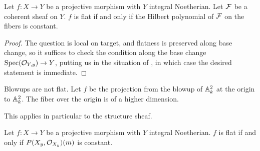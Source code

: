 \begin{proposition}\label{prop: constant hilbert polynomial}
    Let $f:X\to Y$ be a projective morphism with $Y$ integral Noetherian. Let $\mathcal{F}$ be a coherent sheaf on $Y$. $f$ is flat if and only if the Hilbert polynomial of $\mathcal{F}$ on the fibers is constant. 
\end{proposition}
\begin{proof}
    The question is local on target, and flatness is preserved along base change, so it suffices to check the condition along the base change $\operatorname{Spec}(\mathcal{O}_{Y,y})\to Y$, putting us in the situation of , in which case the desired statement is immediate. 
\end{proof}
\begin{example}
    Blowups are not flat. Let $f$ be the projection from the blowup of $\mathbb{A}^{2}_{k}$ at the origin to $\mathbb{A}^{2}_{k}$. The fiber over the origin is of a higher dimension. 
\end{example}
This applies in particular to the structure sheaf. 
\begin{corollary}\label{corr: flatness by Hilbert polynomial}
    Let $f:X\to Y$ be a projective morphism with $Y$ integral Noetherian. $f$ is flat if and only if $P(X_{y},\mathcal{O}_{X_{y}})(m)$ is constant.
\end{corollary}
